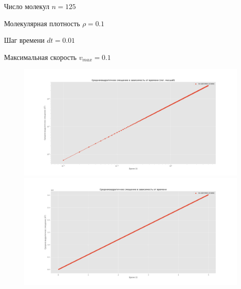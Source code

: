 \documentclass[a4paper,12pt]{article}
\author{Sofia B. Lopez}
\title{}
\begin{document}
Число молекул \(n=125\)

Молекулярная плотность \(\rho=0.1\)

Шаг времени \(dt=0.01\)

Максимальная скорость \(v_{max}=0.1\)

\begin{center}
  \begin{figure}[htb]
    \includegraphics[width=1\textwidth]{../diffusion_log.png}
    \includegraphics[width=1\textwidth]{../diffusion.png}
  \end{figure}
\end{center}
\end{document}
